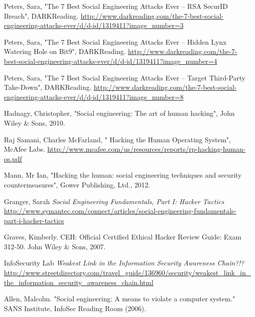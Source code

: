 \documentclass[12pt]{extarticle}
\begin{document}
\begin{thebibliography}{9}


Peters, Sara, "The 7 Best Social Engineering Attacks Ever -- RSA SecurID Breach", DARKReading.
\url{http://www.darkreading.com/the-7-best-social-engineering-attacks-ever/d/d-id/1319411?image_number=3}


Peters, Sara, "The 7 Best Social Engineering Attacks Ever -- Hidden Lynx Watering Hole on Bit9", DARKReading.
\url{http://www.darkreading.com/the-7-best-social-engineering-attacks-ever/d/d-id/1319411?image_number=4}


Peters, Sara, "The 7 Best Social Engineering Attacks Ever -- Target Third-Party Take-Down", DARKReading.
\url{http://www.darkreading.com/the-7-best-social-engineering-attacks-ever/d/d-id/1319411?image_number=8}

Hadnagy, Christopher, "Social engineering: The art of human hacking", John Wiley \& Sons, 2010.


Raj Samani, Charles McFarland, " Hacking the Human Operating System", McAfee Labs.
\url{http://www.mcafee.com/us/resources/reports/rp-hacking-human-os.pdf}

Mann, Mr Ian, "Hacking the human: social engineering techniques and security countermeasures", Gower Publishing, Ltd., 2012.

Granger, Sarah
\textit{Social Engineering Fundamentals, Part I: Hacker Tactics}
\url{http://www.symantec.com/connect/articles/social-engineering-fundamentals-part-i-hacker-tactics}

Graves, Kimberly. CEH: Official Certified Ethical Hacker Review Guide: Exam 312-50. John Wiley \& Sons, 2007.

InfoSecurity Lab
\textit{Weakest Link in the Information Security Awareness Chain?!?}
\url{http://www.streetdirectory.com/travel_guide/136960/security/weakest_link_in_the_information_security_awareness_chain.html}

Allen, Malcolm. "Social engineering: A means to violate a computer system." SANS Institute, InfoSec Reading Room (2006).

\end{thebibliography}
\end{document}
